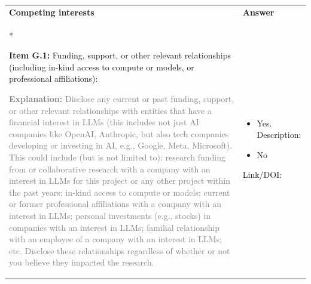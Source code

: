 \documentclass[12pt]{article}
\newcommand{\unchecked}{\ding{111}} %
\begin{document}
\begin{longtable}{|p{}|p{}|}
\hline
\rowcolor{green!20}
\textbf{{Competing interests}} & \textbf{Answer} \\*   %
\hline

\textbf{Item G.1:} Funding, support, or other relevant relationships (including in-kind access to compute or models, or professional affiliations):

\textcolor{gray}{{\footnotesize
\textbf{Explanation:} Disclose any current or past funding, support, or other relevant relationships with entities that have a financial interest in LLMs (this includes not just AI companies like OpenAI, Anthropic, but also tech companies developing or investing in AI, e.g., Google, Meta, Microsoft). This could include (but is not limited to): research funding from or collaborative research with a company with an interest in LLMs for this project or any other project within the past years; in-kind access to compute or models; current or former professional affiliations with a company with an interest in LLMs; personal investments (e.g., stocks) in companies with an interest in LLMs; familial relationship with an employee of a company with an interest in LLMs; etc. Disclose these relationships regardless of whether or not you believe they impacted the research.
}}
&
\begin{itemize}[leftmargin=*]\setlength{\itemsep}{0pt}\setlength{\parskip}{0pt}
    \item[\unchecked] Yes. Description:
    \item[\unchecked] No
\end{itemize}

Link/DOI: \\
\hline
\end{longtable}
\end{document}
